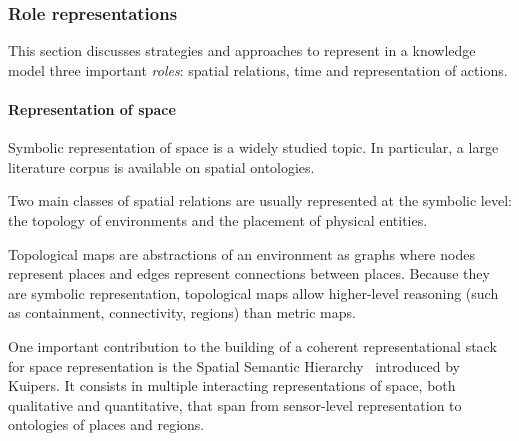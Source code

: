\subsubsection{Role representations}

This section discusses strategies and approaches to represent in a knowledge
model three important \emph{roles}: spatial relations, time and representation
of actions.

\begin{scriptsize}
\begin{center}
\end{center}
\end{scriptsize}


\paragraph{Representation of space}

Symbolic representation of space is a widely studied topic. In particular, a
large literature corpus is available on spatial ontologies.

Two main classes of spatial relations are usually represented at the symbolic
level: the topology of environments and the placement of physical entities.

\begin{scriptsize}
\begin{center}
\end{center}
\end{scriptsize}

Topological maps are abstractions of an environment as graphs where nodes
represent places and edges represent connections between places. Because they
are symbolic representation, topological maps allow higher-level reasoning
(such as containment, connectivity, regions) than metric maps.

One important contribution to the building of a coherent representational stack
for space representation is the Spatial Semantic Hierarchy~\cite{Kuipers2000}
introduced by Kuipers. It consists in multiple interacting representations of
space, both qualitative and quantitative, that span from sensor-level
representation to ontologies of places and regions.

